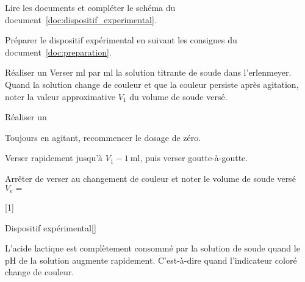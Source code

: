 \schematisation Lire les documents et compléter le schéma du document~\ref{doc:dispositif_experimental}.

\mesure Préparer le dispositif expérimental en suivant les consignes du document~\ref{doc:preparation}.

\mesure Réaliser un 
Verser \unit{\ml} par \unit{\ml} la solution titrante de soude dans l'erlenmeyer.
Quand la solution change de couleur et que la couleur persiste après agitation, noter la valeur approximative $V_1$ du volume de soude versé.

\mesure Réaliser un 
\begin{protocole}
  \item Toujours en agitant, recommencer le dosage de zéro.
  \item Verser rapidement jusqu'à $V_1 - \qty{1}{\ml}$, puis verser goutte-à-goutte.
  \item Arrêter de verser au changement de couleur et noter le volume de soude versé $V_e =$ 
\end{protocole}

[1]


\begin{doc}{Dispositif expérimental}[\label{doc:dispositif_experimental}]
  \begin{center}
  \end{center}
  
  L'acide lactique est complètement consommé par la solution de soude quand le pH de la solution augmente rapidement.
  C'est-à-dire quand l'indicateur coloré change de couleur.
\end{doc}

